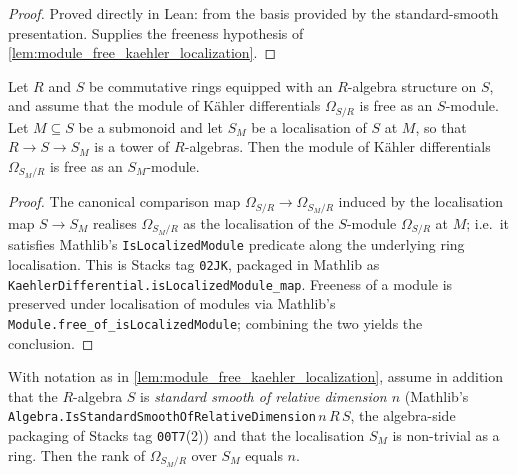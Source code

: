 \begin{proof}
  Proved directly in Lean: from the basis provided by the standard-smooth
  presentation. Supplies the freeness hypothesis of
  \cref{lem:module_free_kaehler_localization}.
\end{proof}

\begin{lemma}


  \label{lem:module_free_kaehler_localization}
  Let \(R\) and \(S\) be commutative rings equipped with an \(R\)-algebra
  structure on \(S\), and assume that the module of K\"ahler differentials
  \(\Omega_{S/R}\) is free as an \(S\)-module. Let \(M \subseteq S\) be a
  submonoid and let \(S_M\) be a localisation of \(S\) at \(M\), so that
  \(R \to S \to S_M\) is a tower of \(R\)-algebras. Then the module of
  K\"ahler differentials \(\Omega_{S_M / R}\) is free as an
  \(S_M\)-module.
\end{lemma}

\begin{proof}
  The canonical comparison map
  \(\Omega_{S/R} \to \Omega_{S_M/R}\) induced by the localisation map
  \(S \to S_M\) realises \(\Omega_{S_M/R}\) as the localisation of the
  \(S\)-module \(\Omega_{S/R}\) at \(M\); i.e.\ it satisfies Mathlib's
  \texttt{IsLocalizedModule} predicate along the underlying ring
  localisation. This is Stacks tag \texttt{02JK}, packaged in Mathlib as
  \texttt{KaehlerDifferential.isLocalizedModule\_map}. Freeness of a
  module is preserved under localisation of modules via Mathlib's
  \texttt{Module.free\_of\_isLocalizedModule}; combining the two yields
  the conclusion.
\end{proof}

\begin{lemma}


  \label{lem:rank_kaehler_localization_eq_relative_dim}
  With notation as in \cref{lem:module_free_kaehler_localization},
  assume in addition that the \(R\)-algebra \(S\) is \emph{standard
  smooth of relative dimension \(n\)} (Mathlib's
  \texttt{Algebra.IsStandardSmoothOfRelativeDimension}\,\(n\)\,\(R\)\,\(S\),
  the algebra-side packaging of Stacks tag \texttt{00T7}(2)) and that
  the localisation \(S_M\) is non-trivial as a ring. Then the rank of
  \(\Omega_{S_M / R}\) over \(S_M\) equals \(n\).
\end{lemma}


